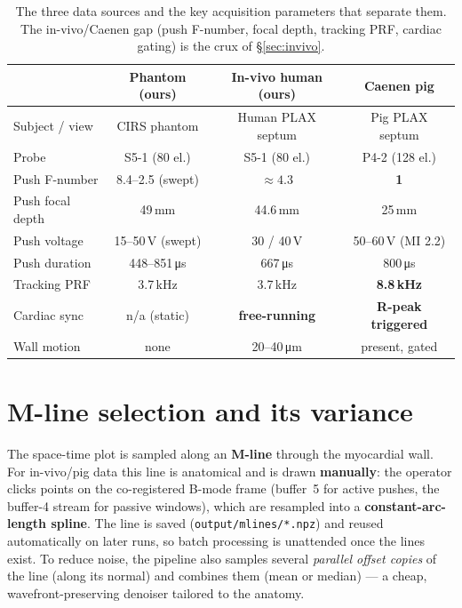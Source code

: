 \documentclass[11pt,a4paper]{article}
\begin{document}
\begin{table}[t]
\centering\small
\caption{The three data sources and the key acquisition parameters that separate them. The in-vivo/Caenen
gap (push F-number, focal depth, tracking PRF, cardiac gating) is the crux of \S\ref{sec:invivo}.}
\label{tab:data}
\begin{tabular}{@{}lccc@{}}
\toprule
 & \textbf{Phantom (ours)} & \textbf{In-vivo human (ours)} & \textbf{Caenen pig} \\
\midrule
Subject / view        & CIRS phantom          & Human PLAX septum        & Pig PLAX septum \\
Probe                 & S5-1 (80 el.)         & S5-1 (80 el.)            & P4-2 (128 el.) \\
Push F-number         & 8.4--2.5 (swept)      & $\approx 4.3$            & \textbf{1} \\
Push focal depth      & 49\,mm                & 44.6\,mm                & 25\,mm \\
Push voltage          & 15--50\,V (swept)     & 30 / 40\,V              & 50--60\,V (MI 2.2) \\
Push duration         & 448--851\,\si{\micro s} & 667\,\si{\micro s}    & 800\,\si{\micro s} \\
Tracking PRF          & 3.7\,kHz              & 3.7\,kHz                & \textbf{8.8\,kHz} \\
Cardiac sync          & n/a (static)          & \textbf{free-running}   & \textbf{R-peak triggered} \\
Wall motion           & none                  & 20--40\,\si{\micro m}   & present, gated \\
\bottomrule
\end{tabular}
\end{table}

\section{M-line selection and its variance}\label{sec:mline}
The space-time plot is sampled along an \textbf{M-line} through the myocardial wall. For in-vivo/pig data
this line is anatomical and is drawn \textbf{manually}: the operator clicks points on the co-registered
B-mode frame (buffer~5 for active pushes, the buffer-4 stream for passive windows), which are resampled
into a \textbf{constant-arc-length spline}. The line is saved (\texttt{output/mlines/*.npz}) and reused
automatically on later runs, so batch processing is unattended once the lines exist. To reduce noise, the
pipeline also samples several \emph{parallel offset copies} of the line (along its normal) and combines them
(mean or median) --- a cheap, wavefront-preserving denoiser tailored to the anatomy.
\end{document}
